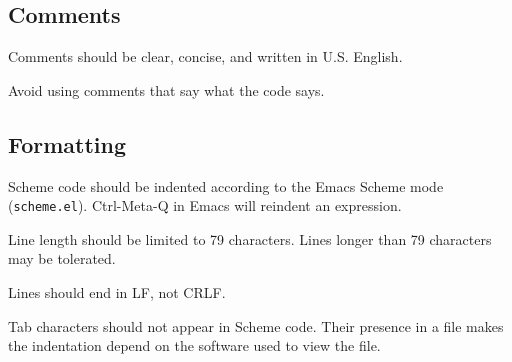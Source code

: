 \documentclass[letterpaper,11pt,twoside,final]{article}
\begin{document}
\subsection* {Comments}

Comments should be clear, concise, and written in U.S. English.

Avoid using comments that say what the code says.

\subsection* {Formatting}

Scheme code should be indented according to the Emacs Scheme mode
(\texttt{scheme.el}). Ctrl-Meta-Q in Emacs will reindent an
expression.

Line length should be limited to 79 characters. Lines longer than 79
characters may be tolerated.

Lines should end in LF, not CRLF.

Tab characters should not appear in Scheme code. Their presence in a
file makes the indentation depend on the software used to view the
file.


\end{document}
